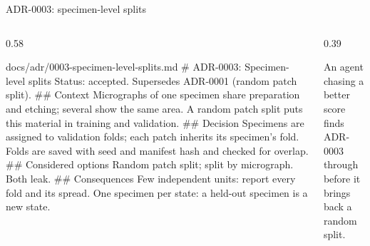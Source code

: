 \begin{frame}[fragile]{ADR-0003: specimen-level splits}
  \begin{columns}[T,onlytextwidth]
    \begin{column}{0.58\textwidth}
\begin{codefile}[basicstyle=\ttfamily\fontsize{7}{8.4}\selectfont]{docs/adr/0003-specimen-level-splits.md}
# ADR-0003: Specimen-level splits
Status: accepted. Supersedes ADR-0001 (random patch split).
## Context
Micrographs of one specimen share preparation and etching;
several show the same area. A random patch split puts this
material in training and validation.
## Decision
Specimens are assigned to validation folds; each patch
inherits its specimen's fold. Folds are saved with seed
and manifest hash and checked for overlap.
## Considered options
Random patch split; split by micrograph. Both leak.
## Consequences
Few independent units: report every fold and its spread.
One specimen per state: a held-out specimen is a new state.
\end{codefile}
    \end{column}
    \begin{column}{0.39\textwidth}
      \par\vskip3mm
      \begin{panel}[fontupper=\footnotesize,colback=bluetint,borderline west={1.2mm}{0pt}{udsblue},left=3.5mm]
        An agent chasing a better score finds ADR-0003 through  before it brings back a
        random split.
      \end{panel}
    \end{column}

\end{columns}
\end{frame}
